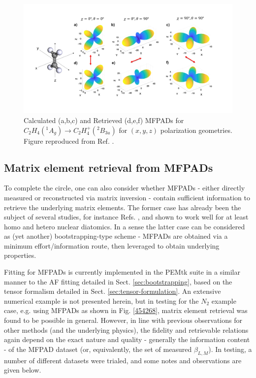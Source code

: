 \documentclass[10pt]{article}
\begin{document}
\begin{figure}[]
\begin{center}
\includegraphics[width=\textwidth,height=\dimexpr\textheight-4\baselineskip-\abovecaptionskip-\belowcaptionskip\relax,keepaspectratio]{figures/D2h1.png}
\caption{Calculated (a,b,c) and Retrieved (d,e,f) MFPADs for \(C_2 H_4(^1A_g) \rightarrow C_2H_4^+(^2B_{3u})\) for \((x,y,z)\) polarization geometries. Figure reproduced from Ref. \cite{gregory2021MolecularFramePhotoelectron}.\label{584598}}
\end{center}
\end{figure}

\subsection{Matrix element retrieval from MFPADs\label{sec:recon-from-MFPADs}}

To complete the circle, one can also consider whether MFPADs - either directly measured or reconstructed via matrix inversion - contain sufficient information to retrieve the underlying matrix elements.  The former case has already been the subject of several studies, for instance Refs. \cite{Gessner2002a,Lebech2003,Cherepkov2005, Yagishita2005}, and shown to work well for at least homo and hetero nuclear diatomics. In a sense the latter case can be considered as (yet another) bootstrapping-type scheme - MFPADs are obtained via a minimum effort/information route, then leveraged to obtain underlying properties. 

Fitting for MFPADs is currently implemented in the PEMtk suite in a similar manner to the AF fitting detailed in Sect. \ref{sec:bootstrapping}, based on the tensor formalism detailed in Sect. \ref{sec:tensor-formulation}. An extensive numerical example is not presented herein, but in testing for the $N_{2}$ example case, e.g. using MFPADs as shown in Fig. \ref{454268}, matrix element retrieval was found to be possible in general. However, in line with previous observations for other methods (and the underlying physics), the fidelity and retrievable relations again depend on the exact nature and quality - generally the information content - of the MFPAD dataset (or, equivalently, the set of measured $\beta_{L,M}$). In testing, a number of different datasets were trialed, and some notes and observations are given below.
\end{document}
